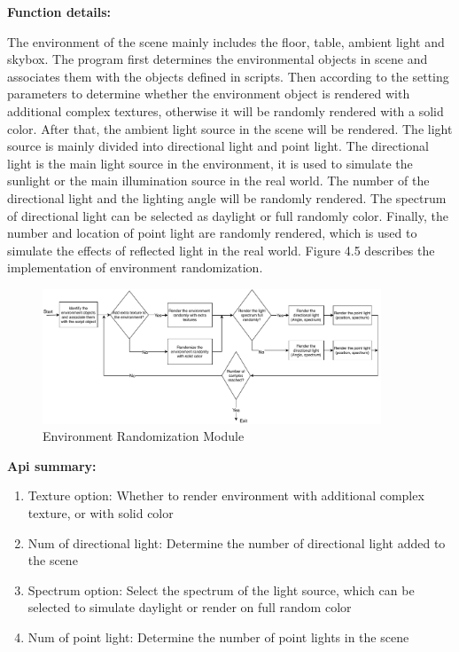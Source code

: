 \textbf{Function details:}

The environment of the scene mainly includes the floor, table, ambient light and skybox. The program first determines the environmental objects in scene and associates them with the objects defined in scripts. Then according to the setting parameters to determine whether the environment object is rendered with additional complex textures, otherwise it will be randomly rendered with a solid color. After that, the ambient light source in the scene will be rendered. The light source is mainly divided into directional light and point light. The directional light is the main light source in the environment, it is used to simulate the sunlight or the main illumination source in the real world. The number of the directional light and the lighting angle will be randomly rendered. The spectrum of directional light can be selected as daylight or full randomly color. Finally, the number and location of point light are randomly rendered, which is used to simulate the effects of reflected light in the real world. Figure 4.5 describes the implementation of environment randomization.
\begin{figure}[h]
	\includegraphics[width=0.9\textwidth]{Figures/Section4_Environment_randomization.pdf} 
	\centering
	\captionsetup{justification=centering}
	\caption{Environment Randomization Module}
	\label{fig:envrd}
\end{figure}

\textbf{Api summary:}
\begin{enumerate}
	\item Texture option: Whether to render environment with additional complex texture, or with solid color
	\item Num of directional light: Determine the number of directional light added to the scene
	\item Spectrum option: Select the spectrum of the light source, which can be selected to simulate daylight or render on full random color
	\item Num of point light: Determine the number of point lights in the scene 
\end{enumerate}

